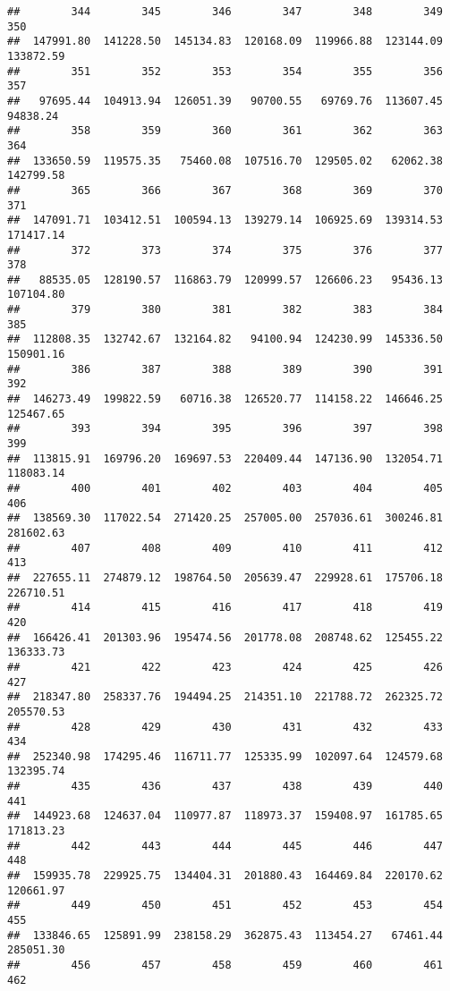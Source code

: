 \documentclass[
]{article}
\begin{document}
\begin{verbatim}
##        344        345        346        347        348        349        350 
##  147991.80  141228.50  145134.83  120168.09  119966.88  123144.09  133872.59 
##        351        352        353        354        355        356        357 
##   97695.44  104913.94  126051.39   90700.55   69769.76  113607.45   94838.24 
##        358        359        360        361        362        363        364 
##  133650.59  119575.35   75460.08  107516.70  129505.02   62062.38  142799.58 
##        365        366        367        368        369        370        371 
##  147091.71  103412.51  100594.13  139279.14  106925.69  139314.53  171417.14 
##        372        373        374        375        376        377        378 
##   88535.05  128190.57  116863.79  120999.57  126606.23   95436.13  107104.80 
##        379        380        381        382        383        384        385 
##  112808.35  132742.67  132164.82   94100.94  124230.99  145336.50  150901.16 
##        386        387        388        389        390        391        392 
##  146273.49  199822.59   60716.38  126520.77  114158.22  146646.25  125467.65 
##        393        394        395        396        397        398        399 
##  113815.91  169796.20  169697.53  220409.44  147136.90  132054.71  118083.14 
##        400        401        402        403        404        405        406 
##  138569.30  117022.54  271420.25  257005.00  257036.61  300246.81  281602.63 
##        407        408        409        410        411        412        413 
##  227655.11  274879.12  198764.50  205639.47  229928.61  175706.18  226710.51 
##        414        415        416        417        418        419        420 
##  166426.41  201303.96  195474.56  201778.08  208748.62  125455.22  136333.73 
##        421        422        423        424        425        426        427 
##  218347.80  258337.76  194494.25  214351.10  221788.72  262325.72  205570.53 
##        428        429        430        431        432        433        434 
##  252340.98  174295.46  116711.77  125335.99  102097.64  124579.68  132395.74 
##        435        436        437        438        439        440        441 
##  144923.68  124637.04  110977.87  118973.37  159408.97  161785.65  171813.23 
##        442        443        444        445        446        447        448 
##  159935.78  229925.75  134404.31  201880.43  164469.84  220170.62  120661.97 
##        449        450        451        452        453        454        455 
##  133846.65  125891.99  238158.29  362875.43  113454.27   67461.44  285051.30 
##        456        457        458        459        460        461        462 

\end{verbatim}
\end{document}
